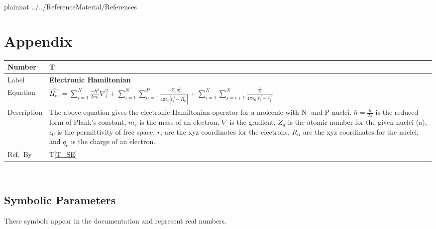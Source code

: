 \documentclass[12pt]{article}
\newcommand{\colAwidth}{0.13\textwidth}
\newcommand{\colBwidth}{0.82\textwidth}
\newcounter{theorynum} %
\newcommand{\tref}[1]{T\ref{#1}}
\begin{document}
\newpage

 {plainnat}
%
 {../../ReferenceMaterial/References}

\newpage

\section{Appendix} \label{appendix}

\noindent
\begin{minipage}{\textwidth}
	\renewcommand*{\arraystretch}{1.5}
	\begin{tabular}{| p{\colAwidth} | p{\colBwidth}|}
		\hline
		\rowcolor[gray]{0.9}
		Number & T{theorynum}\thetheorynum \label{T_HAMEE}\\	
		\hline
		Label&\bf Electronic Hamiltonian \\
		\hline
		Equation&  $\hat{H_{ee}} = 
		\sum\limits_{i=1}^{N}\frac{-\hbar^2}{2m_e}\nabla_i^2 + 
		\sum\limits_{i=1}^{N} 
		\sum\limits_{\alpha=1}^{P}\frac{-Z_a 
			q_e^2}{4\pi\epsilon_0|\overrightarrow{r_i}-\overrightarrow{R_\alpha}|}
			 + 
		\sum\limits_{i=1}^{N}\sum\limits_{j=i+1}^{N}\frac{q_e^2}{4\pi\epsilon_0|\overrightarrow{r_i}-\overrightarrow{r_j}|}
		$ \\
		\hline
		Description & 
		The above equation gives the electronic 
		Hamiltonian operator for a 
		molecule with N-\ce{e-} and P-nuclei. $\hbar = \frac{h}{2\pi}$ is the 
		reduced form of Plank's constant, $m_e$ is the mass of an electron, 
		$\nabla$ is the gradient, $Z_a$ is the atomic number for the given 
		nuclei (a), $\epsilon_0$ is the permittivity of free space, $r_i$ are 
		the 
		xyz coordinates for the electrons, $R_\alpha$ are the xyz coordinates 
		for the nuclei, and $q_e$ is the charge of an electron.
		\\
		\hline
		Ref.\ By & \tref{T_SE}\\
		\hline
	\end{tabular}
\end{minipage}\\

\subsection{Symbolic Parameters}\label{num-const}

These symbols appear in the documentation and represent real numbers.
\end{document}
